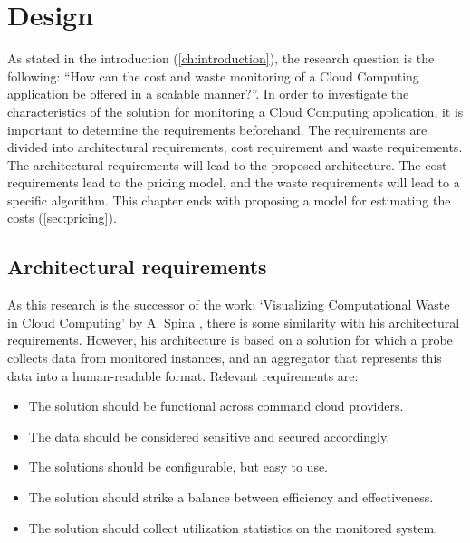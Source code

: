 \chapter{Design}\label{ch:design} %
As stated in the introduction (\autoref{ch:introduction}), the research question is the following: ``How can the cost and waste monitoring of a Cloud Computing application be offered in a scalable manner?''. In order to investigate the characteristics of the solution for monitoring a Cloud Computing application, it is important to determine the requirements beforehand. The requirements are divided into architectural requirements, cost requirement and waste requirements. The architectural requirements will lead to the proposed architecture. The cost requirements lead to the pricing model, and the waste requirements will lead to a specific algorithm. This chapter ends with proposing a model for estimating the costs (\autoref{sec:pricing}).

\section{Architectural requirements} \label{sec:architectural_req}
As this research is the successor of the work: `Visualizing Computational Waste in Cloud Computing' by A. Spina \cite{spina}, there is some similarity with his architectural requirements. However, his architecture is based on a solution for which a probe collects data from monitored instances, and an aggregator that represents this data into a human-readable format. Relevant requirements are:
\begin{itemize}
    \item The solution should be functional across command cloud providers.
    \item The data should be considered sensitive and secured accordingly.
    \item The solutions should be configurable, but easy to use.
    \item The solution should strike a balance between efficiency and effectiveness.
    \item The solution should collect utilization statistics on the monitored system. 
\end{itemize}

